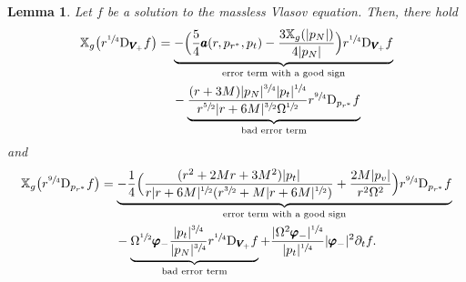 \documentclass[JEP,XML,SOM,Unicode,published]{cedram}
\theoremstyle{plain}
\newtheorem{lemma}[proposition]{Lemma}
\theoremstyle{definition}
\newcommand\T{{\mathbb{X}}}
\begin{document}
\begin{lemma}\label{Propartialprstarbisbis}
Let $f$ be a solution to the massless Vlasov equation. Then, there hold
\begin{align*}
\T_g \bigl(r^{\sfrac{1}{4}}\mathrm{D}_{\pmb{V}_{\!+}} f \bigr) & =\underbrace{-\Bigl(\frac{5}{4}\pmb{a}(r,p_{r^*},p_t)-\frac{3\T_g(|p_N|)}{4|p_N|} \Bigr) r^{\sfrac{1}{4}}\mathrm{D}_{\pmb{V}_{\!+}}f}_{\text{error term with a good sign}} \\
& \quad \, - \underbrace{\frac{(r+3M)|p_N|^{\sfrac{3}{4}}|p_t|^{\sfrac{1}{4}}}{r^{\sfrac{5}{2}}|r+6M|^{\sfrac{3}{2}} \Omega^{\sfrac{1}{2}}} r^{\sfrac{9}{4}} \mathrm{D}_{p_{r^*}}f}_{\text{bad error term}} \end{align*}
and
\begin{align*}
\T_g \bigl(r^{\sfrac{9}{4}}\mathrm{D}_{p_{r^*}} f \bigr)& = \underbrace{-\frac{1}{4}\Bigl(\frac{(r^2+2Mr+3M^2)|p_t|}{r|r+6M|^{\sfrac{1}{2}}(r^{\sfrac{3}{2}}+M|r+6M|^{\sfrac{1}{2}}) }+\frac{2M|p_v|}{r^2 \Omega^2} \Bigr) r^{\sfrac{9}{4}}\mathrm{D}_{p_{r^*}} f}_{\text{error term with a good sign}} \\
& \quad \, -\underbrace{\Omega^{\sfrac{1}{2}}\pmb{\varphi}_-\frac{|p_t|^{\sfrac{3}{4}}}{|p_N|^{\sfrac{3}{4}}} r^{\sfrac{1}{4}}\mathrm{D}_{\pmb{V}_{\!+}} f}_{\text{bad error term}} +\frac{ |\Omega^2\pmb{\varphi}_-|^{\sfrac{1}{4}}}{ |p_t|^{\sfrac{1}{4}}} |\pmb{\varphi}_-|^2 \partial_tf.
\end{align*}
\end{lemma}
\end{document}

